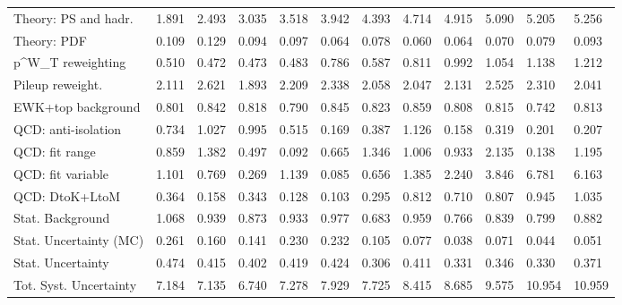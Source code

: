 \begin{tabular}{l|p{0.6cm}p{0.6cm}p{0.6cm}p{0.6cm}p{0.6cm}p{0.6cm}p{0.6cm}p{0.6cm}p{0.6cm}p{0.6cm}p{0.6cm}}
Theory: PS and hadr.                     & 1.891 & 2.493 & 3.035 & 3.518 & 3.942 & 4.393 & 4.714 & 4.915 & 5.090 & 5.205 & 5.256 \\
Theory: PDF                              & 0.109 & 0.129 & 0.094 & 0.097 & 0.064 & 0.078 & 0.060 & 0.064 & 0.070 & 0.079 & 0.093 \\
p^{W}_{T} reweighting                    & 0.510 & 0.472 & 0.473 & 0.483 & 0.786 & 0.587 & 0.811 & 0.992 & 1.054 & 1.138 & 1.212 \\
Pileup reweight.                         & 2.111 & 2.621 & 1.893 & 2.209 & 2.338 & 2.058 & 2.047 & 2.131 & 2.525 & 2.310 & 2.041 \\
EWK+top background                       & 0.801 & 0.842 & 0.818 & 0.790 & 0.845 & 0.823 & 0.859 & 0.808 & 0.815 & 0.742 & 0.813 \\
QCD: anti-isolation                      & 0.734 & 1.027 & 0.995 & 0.515 & 0.169 & 0.387 & 1.126 & 0.158 & 0.319 & 0.201 & 0.207 \\
QCD: fit range                           & 0.859 & 1.382 & 0.497 & 0.092 & 0.665 & 1.346 & 1.006 & 0.933 & 2.135 & 0.138 & 1.195 \\
QCD: fit variable                        & 1.101 & 0.769 & 0.269 & 1.139 & 0.085 & 0.656 & 1.385 & 2.240 & 3.846 & 6.781 & 6.163 \\
QCD: DtoK+LtoM                           & 0.364 & 0.158 & 0.343 & 0.128 & 0.103 & 0.295 & 0.812 & 0.710 & 0.807 & 0.945 & 1.035 \\
Stat. Background                         & 1.068 & 0.939 & 0.873 & 0.933 & 0.977 & 0.683 & 0.959 & 0.766 & 0.839 & 0.799 & 0.882 \\
Stat. Uncertainty (MC)                   & 0.261 & 0.160 & 0.141 & 0.230 & 0.232 & 0.105 & 0.077 & 0.038 & 0.071 & 0.044 & 0.051 \\
\hline
Stat. Uncertainty                        & 0.474 & 0.415 & 0.402 & 0.419 & 0.424 & 0.306 & 0.411 & 0.331 & 0.346 & 0.330 & 0.371 \\
\hline
Tot. Syst. Uncertainty                   & 7.184 & 7.135 & 6.740 & 7.278 & 7.929 & 7.725 & 8.415 & 8.685 & 9.575 & 10.954 & 10.959 \\
\hline
\end{tabular}
